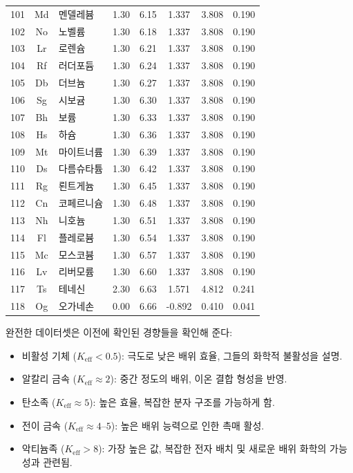 \documentclass[12pt,a4paper]{article}
\newcommand{\Keff}{K_{\mathrm{eff}}}
\begin{document}
\begin{longtable}{|c|c|p{2.5cm}|c|c|c|c|c|}
		101 & Md & 멘델레븀 & 1.30 & 6.15 & 1.337 & 3.808 & 0.190 \\
		102 & No & 노벨륨 & 1.30 & 6.18 & 1.337 & 3.808 & 0.190 \\
		103 & Lr & 로렌슘 & 1.30 & 6.21 & 1.337 & 3.808 & 0.190 \\
		104 & Rf & 러더포듐 & 1.30 & 6.24 & 1.337 & 3.808 & 0.190 \\
		105 & Db & 더브늄 & 1.30 & 6.27 & 1.337 & 3.808 & 0.190 \\
		106 & Sg & 시보귬 & 1.30 & 6.30 & 1.337 & 3.808 & 0.190 \\
		107 & Bh & 보륨 & 1.30 & 6.33 & 1.337 & 3.808 & 0.190 \\
		108 & Hs & 하슘 & 1.30 & 6.36 & 1.337 & 3.808 & 0.190 \\
		109 & Mt & 마이트너륨 & 1.30 & 6.39 & 1.337 & 3.808 & 0.190 \\
		110 & Ds & 다름슈타튬 & 1.30 & 6.42 & 1.337 & 3.808 & 0.190 \\
		111 & Rg & 뢴트게늄 & 1.30 & 6.45 & 1.337 & 3.808 & 0.190 \\
		112 & Cn & 코페르니슘 & 1.30 & 6.48 & 1.337 & 3.808 & 0.190 \\
		113 & Nh & 니호늄 & 1.30 & 6.51 & 1.337 & 3.808 & 0.190 \\
		114 & Fl & 플레로븀 & 1.30 & 6.54 & 1.337 & 3.808 & 0.190 \\
		115 & Mc & 모스코븀 & 1.30 & 6.57 & 1.337 & 3.808 & 0.190 \\
		116 & Lv & 리버모륨 & 1.30 & 6.60 & 1.337 & 3.808 & 0.190 \\
		117 & Ts & 테네신 & 2.30 & 6.63 & 1.571 & 4.812 & 0.241 \\
		118 & Og & 오가네손 & 0.00 & 6.66 & -0.892 & 0.410 & 0.041 \\
		\hline
	\end{longtable}
	
	완전한 데이터셋은 이전에 확인된 경향들을 확인해 준다:
	\begin{itemize}
		\item 비활성 기체 ($\Keff < 0.5$): 극도로 낮은 배위 효율, 그들의 화학적 불활성을 설명.
		\item 알칼리 금속 ($\Keff \approx 2$): 중간 정도의 배위, 이온 결합 형성을 반영.
		\item 탄소족 ($\Keff \approx 5$): 높은 효율, 복잡한 분자 구조를 가능하게 함.
		\item 전이 금속 ($\Keff \approx 4$--$5$): 높은 배위 능력으로 인한 촉매 활성.
		\item 악티늄족 ($\Keff > 8$): 가장 높은 값, 복잡한 전자 배치 및 새로운 배위 화학의 가능성과 관련됨.
	\end{itemize}
	
\end{document}
